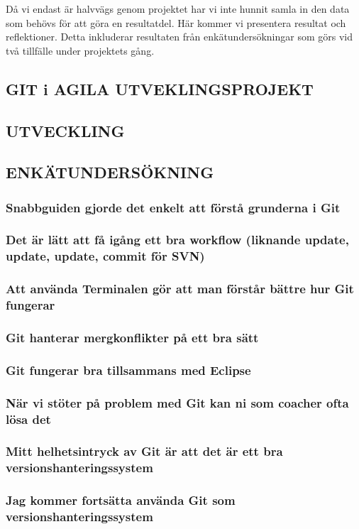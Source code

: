 Då vi endast är halvvägs genom projektet har vi inte hunnit samla in den data som behövs för att göra en resultatdel. Här kommer vi presentera resultat och reflektioner. Detta inkluderar resultaten från enkätundersökningar som görs vid två tillfälle under projektets gång. 

\subsection{GIT i AGILA UTVEKLINGSPROJEKT}
\subsection{UTVECKLING}
\subsection{ENKÄTUNDERSÖKNING}

\subsubsection{Snabbguiden gjorde det enkelt att förstå grunderna i Git}

\subsubsection{Det är lätt att få igång ett bra workflow (liknande update, update, update, commit för SVN)}


\subsubsection{Att använda Terminalen gör att man förstår bättre hur Git fungerar}


\subsubsection{Git hanterar mergkonflikter på ett bra sätt}


\subsubsection{Git fungerar bra tillsammans med Eclipse}


\subsubsection{När vi stöter på problem med Git kan ni som coacher ofta lösa det}


\subsubsection{Mitt helhetsintryck av Git är att det är ett bra versionshanteringssystem}


\subsubsection{Jag kommer fortsätta använda Git som versionshanteringssystem}

